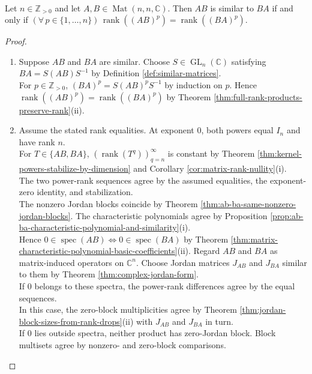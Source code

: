 \begin{corollary} \label{cor:ab-ba-similar-rank-power-criterion} \\
Let $n\in\mathbb{Z}_{>0}$ and let $A,B\in\operatorname{Mat}(n,n,\mathbb{C})$. Then $AB$ is similar to $BA$ if and only if $(\forall\,p\in\{1,\ldots,n\})\,\operatorname{rank}((AB)^p)=\operatorname{rank}((BA)^p)$.
\begin{proof}
\begin{enumerate}[label=\roman*.]
\setlength{\itemsep}{0pt}
\item[$(\Rightarrow)$] Suppose $AB$ and $BA$ are similar. Choose $S\in\operatorname{GL}_n(\mathbb{C})$ satisfying $BA=S(AB)S^{-1}$ by Definition \ref{def:similar-matrices}.\\
For $p\in\mathbb{Z}_{>0}$, $(BA)^p=S(AB)^pS^{-1}$ by induction on $p$. Hence $\operatorname{rank}((AB)^p)=\operatorname{rank}((BA)^p)$ by Theorem \ref{thm:full-rank-products-preserve-rank}(ii).
\item[$(\Leftarrow)$] Assume the stated rank equalities. At exponent $0$, both powers equal $I_n$ and have rank $n$.\\
For $T\in\{AB,BA\}$, $(\operatorname{rank}(T^q))_{q=n}^{\infty}$ is constant by Theorem \ref{thm:kernel-powers-stabilize-by-dimension} and Corollary \ref{cor:matrix-rank-nullity}(i).\\
The two power-rank sequences agree by the assumed equalities, the exponent-zero identity, and stabilization.\\
The nonzero Jordan blocks coincide by Theorem \ref{thm:ab-ba-same-nonzero-jordan-blocks}. The characteristic polynomials agree by Proposition \ref{prop:ab-ba-characteristic-polynomial-and-similarity}(i).\\
Hence $0\in\operatorname{spec}(AB)\Longleftrightarrow0\in\operatorname{spec}(BA)$ by Theorem \ref{thm:matrix-characteristic-polynomial-basic-coefficients}(ii). Regard $AB$ and $BA$ as matrix-induced operators on $\mathbb{C}^n$. Choose Jordan matrices $J_{AB}$ and $J_{BA}$ similar to them by Theorem \ref{thm:complex-jordan-form}.\\
If $0$ belongs to these spectra, the power-rank differences agree by the equal sequences.\\
In this case, the zero-block multiplicities agree by Theorem \ref{thm:jordan-block-sizes-from-rank-drops}(ii) with $J_{AB}$ and $J_{BA}$ in turn.\\
If $0$ lies outside spectra, neither product has zero-Jordan block. Block multisets agree by nonzero- and zero-block comparisons.\\

\end{enumerate}
\end{proof}
\end{corollary}
